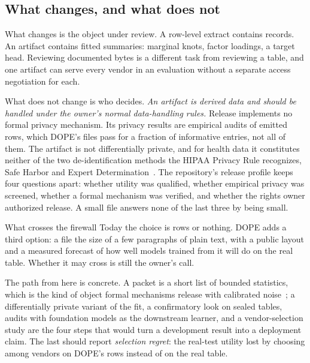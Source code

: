 \documentclass[10pt,letterpaper,twocolumn]{article}
\begin{document}
\subsection{What changes, and what does not}
What changes is the object under review. A row-level extract contains records. An artifact contains fitted summaries: marginal knots, factor loadings, a target head. Reviewing  documented bytes is a different task from reviewing a table, and one artifact can serve every vendor in an evaluation without a separate access negotiation for each.

What does not change is who decides. \emph{An artifact is derived data and should be handled under the owner's normal data-handling rules.} Release  implements no formal privacy mechanism. Its privacy results are empirical audits of emitted rows, which DOPE's files pass for a fraction  of informative entries, not all of them. The artifact is not differentially private, and for health data it constitutes neither of the two de-identification methods the HIPAA Privacy Rule recognizes, Safe Harbor and Expert Determination~\cite{hhs2012deid}. The repository's release profile keeps four questions apart: whether utility was qualified, whether empirical privacy was screened, whether a formal mechanism was verified, and whether the rights owner authorized release. A small file answers none of the last three by being small.

\begin{callout}{What crosses the firewall}
Today the choice is rows or nothing. DOPE adds a third option: a file the size of a few paragraphs of plain text, with a public layout and a measured forecast of how well models trained from it will do on the real table. Whether it may cross is still the owner's call.
\end{callout}

The path from here is concrete. A packet is a short list of bounded statistics, which is the kind of object formal mechanisms release with calibrated noise~\cite{mckenna2021mst,mckenna2022aim}; a differentially private variant of the fit, a confirmatory look on sealed tables, audits with foundation models as the downstream learner, and a vendor-selection study are the four steps that would turn a development result into a deployment claim. The last should report \emph{selection regret}: the real-test utility lost by choosing among vendors on DOPE's rows instead of on the real table.
\end{document}
